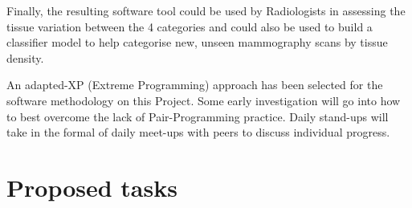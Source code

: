 \documentclass[11pt,fleqn,twoside]{article}
\begin{document}
Finally, the resulting software tool could be used by Radiologists in assessing the tissue variation between the 4 categories and could also be used to build a classifier model to help categorise new, unseen mammography scans by tissue density.

An adapted-XP (Extreme Programming) approach has been selected for the software methodology on this Project. Some early investigation will go into how to best overcome the lack of Pair-Programming practice. Daily stand-ups will take in the formal of daily meet-ups with peers to discuss individual progress. \par

\section{Proposed tasks}
\end{document}

